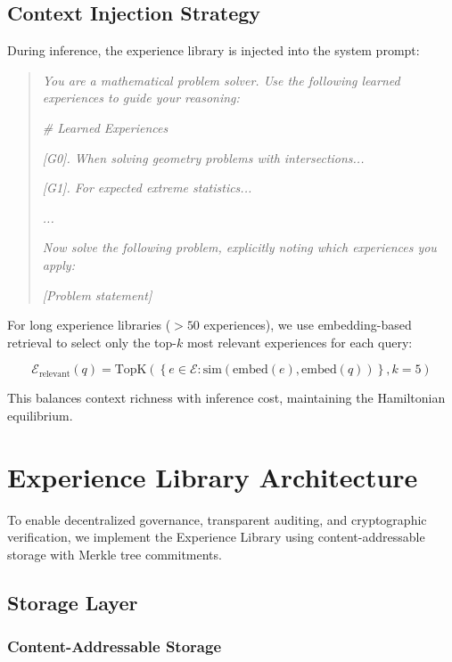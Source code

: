 \documentclass[11pt,a4paper]{article}
\begin{document}
\subsection{Context Injection Strategy}

During inference, the experience library is injected into the system prompt:

\begin{quote}
\small
\textit{You are a mathematical problem solver. Use the following learned experiences to guide your reasoning:}

\textit{\# Learned Experiences}

\textit{[G0]. When solving geometry problems with intersections...}

\textit{[G1]. For expected extreme statistics...}

\textit{...}

\textit{Now solve the following problem, explicitly noting which experiences you apply:}

\textit{[Problem statement]}
\end{quote}

For long experience libraries ($>50$ experiences), we use embedding-based retrieval to select only the top-$k$ most relevant experiences for each query:

\begin{equation}
\mathcal{E}_{\text{relevant}}(q) = \text{TopK}\left(\left\{ e \in \mathcal{E} : \text{sim}(\text{embed}(e), \text{embed}(q)) \right\}, k=5\right)
\end{equation}

This balances context richness with inference cost, maintaining the Hamiltonian equilibrium.

\section{Experience Library Architecture}
\label{sec:architecture}

To enable decentralized governance, transparent auditing, and cryptographic verification, we implement the Experience Library using content-addressable storage with Merkle tree commitments.

\subsection{Storage Layer}

\subsubsection{Content-Addressable Storage}
\end{document}
